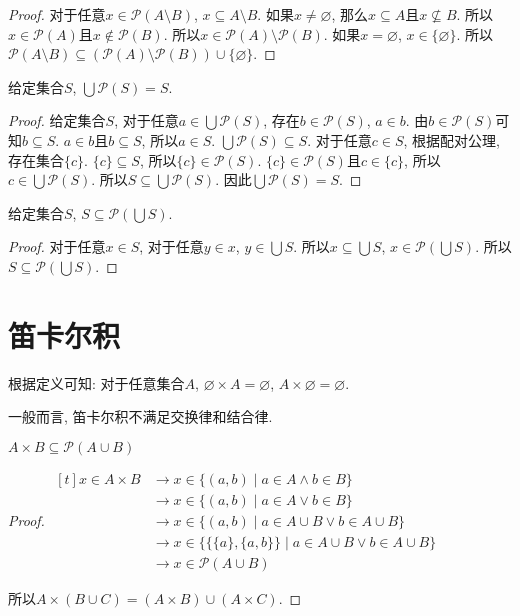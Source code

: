 \begin{proof}
	对于任意$x\in \mathscr P(A\setminus B)$, $x\subseteq A\setminus B$. 如果$x\neq \varnothing$, 那么$x\subseteq A$且$x\not \subseteq B$. 所以$x\in \mathscr P(A)$且$x\notin \mathscr P(B)$. 所以$x\in \mathscr P(A)\setminus \mathscr P(B)$. 如果$x=\varnothing$, $x\in \{\varnothing\}$. 所以$\mathscr P(A\setminus B)\subseteq (\mathscr P(A)\setminus \mathscr P(B))\cup \{\varnothing\}$.
\end{proof}

\begin{proposition}
	给定集合$S$, $\bigcup \mathscr P(S)=S$.
\end{proposition}

\begin{proof}
	给定集合$S$, 对于任意$a\in \bigcup \mathscr P(S)$, 存在$b\in \mathscr P(S)$, $a\in b$. 由$b\in \mathscr P(S)$可知$b\subseteq S$. $a\in b$且$b\subseteq S$, 所以$a\in S$. $\bigcup \mathscr P(S)\subseteq S$. 对于任意$c\in S$, 根据配对公理, 存在集合$\{c\}$. $\{c\}\subseteq S$, 所以$\{c\}\in \mathscr P(S)$. $\{c\}\in \mathscr P(S)$且$c\in \{c\}$, 所以$c\in \bigcup \mathscr P(S)$. 所以$S\subseteq \bigcup \mathscr P(S)$. 因此$\bigcup \mathscr P(S)=S$.
\end{proof}

\begin{proposition}
	给定集合$S$, $S\subseteq \mathscr P(\bigcup S)$.
\end{proposition}

\begin{proof}
	对于任意$x\in S$, 对于任意$y\in x$, $y\in \bigcup S$. 所以$x\subseteq \bigcup S$, $x\in \mathscr P(\bigcup S)$.  所以$S\subseteq \mathscr P(\bigcup S)$.
\end{proof}

\section{笛卡尔积}
	根据定义可知: 对于任意集合$A$, $\varnothing \times A=\varnothing$, $A\times \varnothing=\varnothing$.

	一般而言, 笛卡尔积不满足交换律和结合律.

\begin{proposition}
	$A\times B\subseteq \mathscr P(A\cup B)$
\end{proposition}

\begin{proof}
	$\begin{aligned}[t]
		x\in A\times B & \rightarrow x\in \{(a,b)\mid a\in A\wedge b\in B\}\\
		& \rightarrow x\in \{(a,b)\mid a\in A\vee b\in B\}\\
		& \rightarrow x\in \{(a,b)\mid a\in A\cup B\vee b\in A\cup B\}\\
		& \rightarrow x\in \{\{\{a\},\{a,b\}\}\mid a\in A\cup B\vee b\in A\cup B\}\\
		& \rightarrow x\in \mathscr P(A\cup B)
	\end{aligned}$
	
	所以$A\times (B\cup C)=(A\times B)\cup (A\times C)$.
\end{proof}

